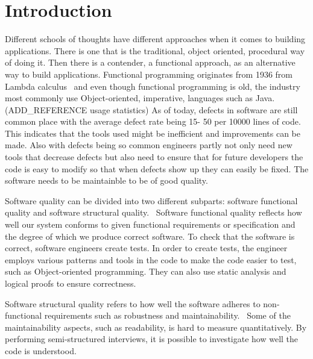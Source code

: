 \chapter{Introduction}\label{introduction}

Different schools of thoughts have different approaches when it comes to
building applications. There is one that is the traditional, object oriented,
procedural way of doing it. Then there is a contender, a functional approach, as
an alternative way to build applications. Functional programming originates from
1936 from Lambda calculus~\cite{Turner} and even though functional programming
is old, the industry most commonly use Object-oriented, imperative, languages
such as Java. (ADD\_REFERENCE usage statistics) As of today, defects in software
are still common place with the average defect rate being 15- 50 per 10000 lines
of code.~\cite{McConnell:2004:CCS:1096143} This indicates that the tools used
might be inefficient and improvements can be made. Also with defects being so
common engineers partly not only need new tools that decrease defects but also
need to ensure that for future developers the code is easy to modify so that
when defects show up they can easily be fixed. The software needs to be
maintainble to be of good quality.

Software quality can be divided into two different subparts: software functional
quality and software structural quality.~\cite{Pressman:2004:SEP:994110}
Software functional quality reflects how well our system conforms to given
functional requirements or specification and the degree of which we produce
correct software.  To check that the software is correct, software engineers
create tests. In order to create tests, the engineer employs various patterns
and tools in the code to make the code easier to test, such as Object-oriented
programming. They can also use static analysis and logical proofs to ensure
correctness. 

Software structural quality refers to how well the software adheres to
non-functional requirements such as robustness and
maintainability.~\cite{Pressman:2004:SEP:994110} Some of the maintainability
aspects, such as readability, is hard to measure quantitatively. By performing
semi-structured interviews, it is possible to investigate how well the code is
understood. 

